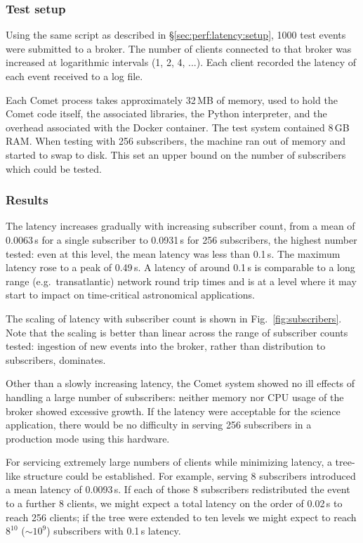 \documentclass[5p,authoryear]{elsarticle}
\begin{document}
\subsubsection{Test setup}

Using the same script as described in \S\ref{sec:perf:latency:setup}, 1000
test events were submitted to a broker. The number of clients connected to
that broker was increased at logarithmic intervals (1, 2, 4, ...). Each client
recorded the latency of each event received to a log file.

Each Comet process takes approximately 32\,MB of memory, used to hold the
Comet code itself, the associated libraries, the Python interpreter, and the
overhead associated with the Docker container. The test system contained 8\,GB
RAM\@. When testing with 256 subscribers, the machine ran out of memory and
started to swap to disk. This set an upper bound on the number of subscribers
which could be tested.

\subsubsection{Results}

The latency increases gradually with increasing subscriber count, from a mean
of 0.0063\,s for a single subscriber to 0.0931\,s for 256 subscribers, the
highest number tested: even at this level, the mean latency was less than
0.1\,s. The maximum latency rose to a peak of 0.49\,s.  A latency of around
0.1\,s is comparable to a long range (e.g.\ transatlantic) network round trip
times and is at a level where it may start to impact on time-critical
astronomical applications.

The scaling of latency with subscriber count is shown in
Fig.~\ref{fig:subscribers}. Note that the scaling is better than linear across
the range of subscriber counts tested: ingestion of new events into the
broker, rather than distribution to subscribers, dominates.

Other than a slowly increasing latency, the Comet system showed no
ill effects of handling a large number of subscribers: neither memory nor CPU
usage of the broker showed excessive growth. If the latency were acceptable
for the science application, there would be no difficulty in serving 256
subscribers in a production mode using this hardware.

For servicing extremely large numbers of clients while minimizing latency, a
tree-like structure could be established. For example, serving 8 subscribers
introduced a mean latency of 0.0093\,s. If each of those 8 subscribers
redistributed the event to a further 8 clients, we might expect a total
latency on the order of 0.02\,s to reach 256 clients; if the tree were
extended to ten levels we might expect to reach $8^{10}$ ($\sim10^9$)
subscribers with 0.1\,s latency.
\end{document}
